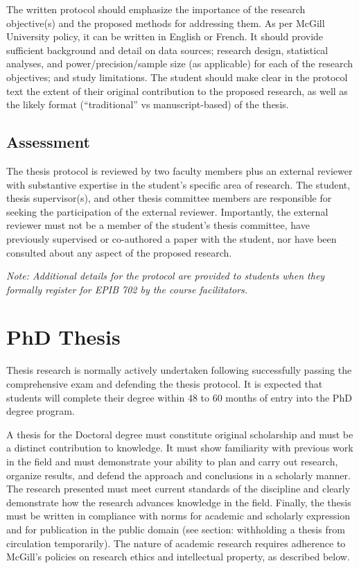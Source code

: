 \documentclass[
  openany]{book}
\begin{document}
The written protocol should emphasize the importance of the research objective(s) and the proposed methods for addressing them. As per McGill University policy, it can be written in English or French. It should provide sufficient background and detail on data sources; research design, statistical analyses, and power/precision/sample size (as applicable) for each of the research objectives; and study limitations. The student should make clear in the protocol text the extent of their original contribution to the proposed research, as well as the likely format (``traditional'' vs manuscript-based) of the thesis.

\hypertarget{assessment}{%
\section{Assessment}\label{assessment}}

The thesis protocol is reviewed by two faculty members plus an external reviewer with substantive expertise in the student's specific area of research. The student, thesis supervisor(s), and other thesis committee members are responsible for seeking the participation of the external reviewer. Importantly, the external reviewer must not be a member of the student's thesis committee, have previously supervised or co-authored a paper with the student, nor have been consulted about any aspect of the proposed research.

\emph{Note: Additional details for the protocol are provided to students when they formally register for EPIB 702 by the course facilitators.}

\hypertarget{phd-thesis}{%
\chapter{PhD Thesis}\label{phd-thesis}}

Thesis research is normally actively undertaken following successfully passing the comprehensive exam and defending the thesis protocol. It is expected that students will complete their degree within 48 to 60 months of entry into the PhD degree program.

A thesis for the Doctoral degree must constitute original scholarship and must be a distinct contribution to knowledge. It must show familiarity with previous work in the field and must demonstrate your ability to plan and carry out research, organize results, and defend the approach and conclusions in a scholarly manner. The research presented must meet current standards of the discipline and clearly demonstrate how the research advances knowledge in the field. Finally, the thesis must be written in compliance with norms for academic and scholarly expression and for publication in the public domain (see section: withholding a thesis from circulation temporarily). The nature of academic research requires adherence to McGill's policies on research ethics and intellectual property, as described below.
\end{document}
